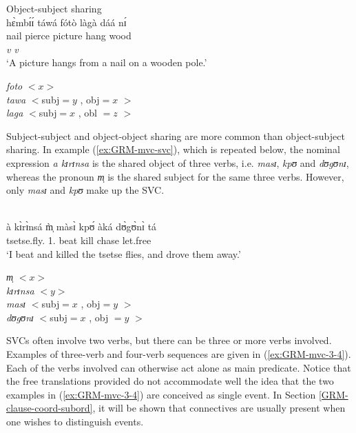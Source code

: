 \ea\label{ex:GRM-arg-sh-objsubj}{\rm Object-subject sharing}\\
\glll  hɛ̀mbɪ́ɪ́ táwá fótò làgà dáá nɪ́\\
nail pierce picture hang wood  {\postp}\\
{} {\it v} {}  {\it v} \\
 \glt `A picture hangs from a nail on a wooden pole.'

{\it foto} $<x>$\\
{\it tawa} $<${\sc subj}$ =  y$ ,  {\sc obj}$=x$  $> $\\
{\it laga} $<${\sc subj}$ = x$ , {\sc obl} $= z $  $ >$\\
\z




Subject-subject and object-object sharing are more common than object-subject
sharing. In example
(\ref{ex:GRM-mvc-svc}), which is repeated below, the nominal expression {\it a 
 kɪrɪnsa} is the shared object of three verbs, i.e. {\it masɪ}, {\it kpʊ} and 
{\it dʊgʊnɪ}, whereas the pronoun {\it m̩} is the shared subject for the same 
three
verbs. However, only {\it masɪ} and {\it kpʊ}  make up the SVC. 

\begin{exe}


\\
\gll à     kɪ̀rɪ̀nsá      m̩̀      màsɪ̀   kpʊ́    àká    dʊ̀gʊ̀nɪ̀ tá\\
{\art}  tsetse.fly.{\pl}   {1.\sg}       beat   kill   {\conn} 
chase         let.free\\
\glt `I beat and killed the tsetse flies, and drove them away.'

{\it m̩} $<x>$\\
{\it kɪrɪnsa} $<y>$\\
{\it masɪ} $<${\sc subj}$ =  x$ ,  {\sc obj}$=y$  $> $\\
{\it dʊgʊnɪ} $<${\sc subj}$ = x$ , {\sc obj} $= y $  $ >$\\
 
\end{exe}

SVCs often involve two verbs, but there can be three or more verbs involved. 
Examples of three-verb and four-verb sequences are given in
(\ref{ex:GRM-mvc-3-4}). Each of the verbs involved can otherwise act alone as
main
predicate. Notice that the free translations provided do not accommodate well
the idea that
the two examples in (\ref{ex:GRM-mvc-3-4}) are conceived as single event.
In Section \ref{GRM-clause-coord-subord},  it will be shown that connectives
are usually present  when one wishes to distinguish events.


